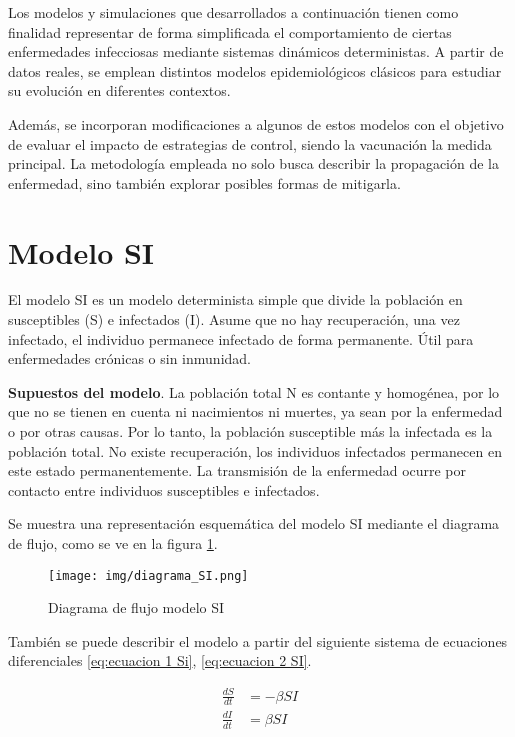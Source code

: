 Los modelos y simulaciones que desarrollados a continuación tienen como finalidad representar de forma simplificada el comportamiento de ciertas enfermedades infecciosas mediante sistemas dinámicos deterministas. A partir de datos reales, se emplean distintos modelos epidemiológicos clásicos para estudiar su evolución en diferentes contextos.

Además, se incorporan modificaciones a algunos de estos modelos con el objetivo de evaluar el impacto de estrategias de control, siendo la vacunación la medida principal. La metodología empleada no solo busca describir la propagación de la enfermedad, sino también explorar posibles formas de mitigarla.

\section{Modelo SI}
El modelo SI es un modelo determinista simple que divide la población en susceptibles (S) e infectados (I). Asume que no hay recuperación, una vez infectado, el individuo permanece infectado de forma permanente. Útil para enfermedades crónicas o sin inmunidad.

\textbf{Supuestos del modelo}. La población total N es contante y homogénea, por lo que no se tienen en cuenta ni nacimientos ni muertes, ya sean por la enfermedad o por otras causas. Por lo tanto, la población susceptible más la infectada es la población total. No existe recuperación, los individuos infectados permanecen en este estado permanentemente. La transmisión de la enfermedad ocurre por contacto entre individuos susceptibles e infectados.

Se muestra una representación esquemática del modelo SI mediante el diagrama de flujo, como se ve en la figura \ref{fig:diagrama SI}.

\begin{figure}[H]
    \centering
    \texttt{[image: img/diagrama\_SI.png]}
    \caption{Diagrama de flujo modelo SI}
    \label{fig:diagrama SI}
    \vspace{0.5cm} %
\end{figure}

También se puede describir el modelo a partir del siguiente sistema de ecuaciones diferenciales \ref{eq:ecuacion 1 Si}, \ref{eq:ecuacion 2 SI}.

\begin{align}
\frac{dS}{dt} &= -\beta SI \label{eq:ecuacion 1 Si} \\
\frac{dI}{dt} &= \beta SI \label{eq:ecuacion 2 SI}
\end{align}


